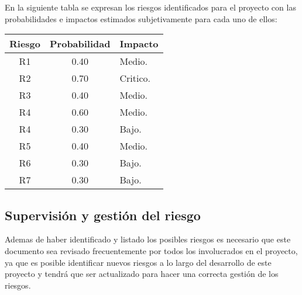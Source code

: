 \documentclass[12pt,a4paper]{article}
\begin{document}
En la siguiente tabla se expresan los riesgos identificados para el proyecto con las
probabilidades e impactos estimados subjetivamente para cada uno de ellos: 
\vspace{1 cm}
\begin{table}[h!]
\begin{tabular}{|c|c|p{8cm}|}
\hline
\textbf{Riesgo}&\textbf{Probabilidad}&\textbf{Impacto}
\\\hline
R1&0.40&Medio.\\\hline
R2&0.70&Critico.\\\hline
R3&0.40&Medio.\\\hline
R4&0.60&Medio.\\\hline
R4&0.30&Bajo.\\\hline
R5&0.40&Medio.\\\hline
R6&0.30&Bajo.\\\hline
R7&0.30&Bajo.\\\hline
\end{tabular}
\end{table}

\subsection{Supervisión y gestión del riesgo}
Ademas de haber identificado y listado los posibles riesgos es necesario que este documento sea revisado frecuentemente por todos los involucrados en el proyecto, ya que es posible identificar nuevos riesgos a lo largo del desarrollo de este proyecto y tendrá que ser actualizado para hacer una correcta gestión de los riesgos.
\vspace{1 cm}
\end{document}
